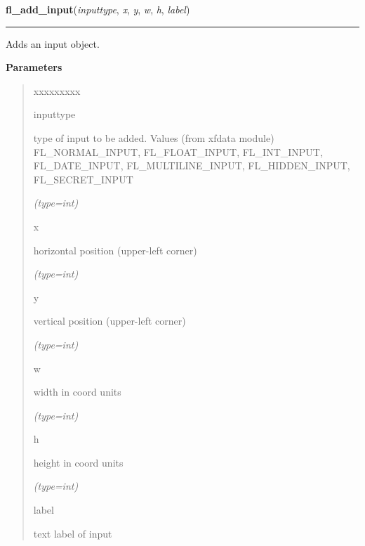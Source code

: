     \vspace{0.5ex}

\hspace{.8\funcindent}\begin{boxedminipage}{\funcwidth}

    \raggedright \textbf{fl\_add\_input}(\textit{inputtype}, \textit{x}, \textit{y}, \textit{w}, \textit{h}, \textit{label})

    \vspace{-1.5ex}

    \rule{\textwidth}{0.5\fboxrule}
\setlength{\parskip}{2ex}
    Adds an input object.

\setlength{\parskip}{1ex}
      \textbf{Parameters}
      \vspace{-1ex}

      \begin{quote}
        \begin{Ventry}{xxxxxxxxx}

          \item[inputtype]

          type of input to be added. Values (from xfdata module) 
          FL\_NORMAL\_INPUT, FL\_FLOAT\_INPUT, FL\_INT\_INPUT, 
          FL\_DATE\_INPUT, FL\_MULTILINE\_INPUT, FL\_HIDDEN\_INPUT, 
          FL\_SECRET\_INPUT

            {\it (type=int)}

          \item[x]

          horizontal position (upper-left corner)

            {\it (type=int)}

          \item[y]

          vertical position (upper-left corner)

            {\it (type=int)}

          \item[w]

          width in coord units

            {\it (type=int)}

          \item[h]

          height in coord units

            {\it (type=int)}

          \item[label]

          text label of input


\end{Ventry}
\end{quote}
\end{boxedminipage}
